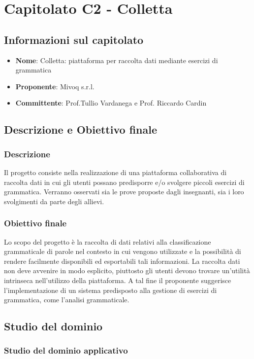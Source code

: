 \section{Capitolato C2 - Colletta}
\subsection{Informazioni sul capitolato}
\begin{itemize}
	\item \textbf{Nome}: Colletta: piattaforma per raccolta dati
	mediante esercizi di grammatica
	\item \textbf{Proponente}: Mivoq s.r.l.
	\item \textbf{Committente}: Prof.Tullio Vardanega e Prof. Riccardo Cardin
\end{itemize}
\subsection{Descrizione e Obiettivo finale}
\subsubsection{Descrizione}

Il progetto consiste nella realizzazione di una piattaforma collaborativa di raccolta dati in cui gli utenti possano predisporre e/o svolgere piccoli esercizi di grammatica. Verranno osservati sia le prove proposte dagli insegnanti, sia i loro svolgimenti da parte degli allievi.
\subsubsection{Obiettivo finale}

Lo scopo del progetto è la raccolta di dati relativi alla classificazione grammaticale di parole nel contesto in cui vengono utilizzate e la possibilità di rendere facilmente disponibili ed esportabili tali informazioni. La raccolta dati non deve avvenire in modo esplicito, piuttosto gli utenti devono trovare un'utilità intrinseca nell'utilizzo della piattaforma. A tal fine il proponente suggerisce l'implementazione di un sistema predisposto alla gestione di esercizi di grammatica, come l'analisi grammaticale. 
\subsection{Studio del dominio}
\subsubsection{Studio del dominio applicativo}


